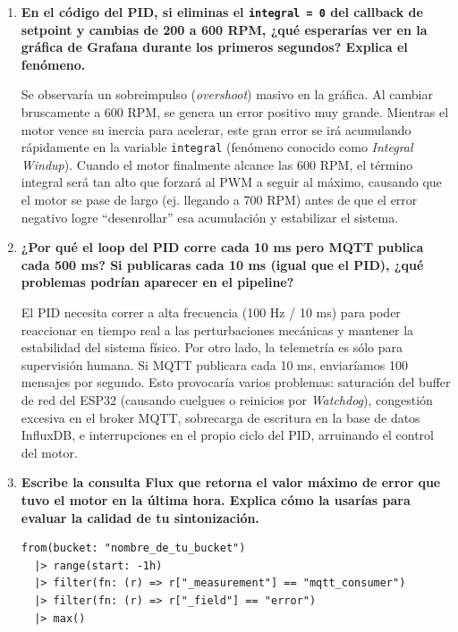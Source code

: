 \documentclass[11pt, letterpaper]{article}
\begin{document}
\begin{enumerate}[leftmargin=1.5cm, label=\textbf{P\arabic*.}, itemsep=0.4cm]

  \item \textbf{En el c\'odigo del PID, si eliminas el \texttt{integral = 0}
        del callback de setpoint y cambias de 200 a 600 RPM,
        ¿qu\'e esperar\'ias ver en la gr\'afica de Grafana durante
        los primeros segundos? Explica el fen\'omeno.}

    Se observar\'ia un sobreimpulso (\textit{overshoot}) masivo en la gr\'afica. Al cambiar bruscamente a 600 RPM, se genera un error positivo muy grande. Mientras el motor vence su inercia para acelerar, este gran error se ir\'a acumulando r\'apidamente en la variable \texttt{integral} (fen\'omeno conocido como \textit{Integral Windup}). Cuando el motor finalmente alcance las 600 RPM, el t\'ermino integral ser\'a tan alto que forzar\'a al PWM a seguir al m\'aximo, causando que el motor se pase de largo (ej. llegando a 700 RPM) antes de que el error negativo logre ``desenrollar'' esa acumulaci\'on y estabilizar el sistema.
  

  \item \textbf{¿Por qu\'e el loop del PID corre cada 10 ms pero
        MQTT publica cada 500 ms? Si publicaras cada 10 ms
        (igual que el PID), ¿qu\'e problemas podr\'ian aparecer
        en el pipeline?}

El PID necesita correr a alta frecuencia (100 Hz / 10 ms) para poder reaccionar en tiempo real a las perturbaciones mec\'anicas y mantener la estabilidad del sistema f\'isico. Por otro lado, la telemetr\'ia es s\'olo para supervisi\'on humana. Si MQTT publicara cada 10 ms, enviar\'iamos 100 mensajes por segundo. Esto provocar\'ia varios problemas: saturaci\'on del buffer de red del ESP32 (causando cuelgues o reinicios por \textit{Watchdog}), congesti\'on excesiva en el broker MQTT, sobrecarga de escritura en la base de datos InfluxDB, e interrupciones en el propio ciclo del PID, arruinando el control del motor.


  \item \textbf{Escribe la consulta Flux que retorna el valor
        m\'aximo de error que tuvo el motor en la \'ultima hora.
        Explica c\'omo la usar\'ias para evaluar la calidad de tu
        sintonizaci\'on.}

  \begin{lstlisting}[style=flux, numbers=none]
from(bucket: "nombre_de_tu_bucket")
  |> range(start: -1h)
  |> filter(fn: (r) => r["_measurement"] == "mqtt_consumer")
  |> filter(fn: (r) => r["_field"] == "error")
  |> max()
  \end{lstlisting}


\end{enumerate}
\end{document}
